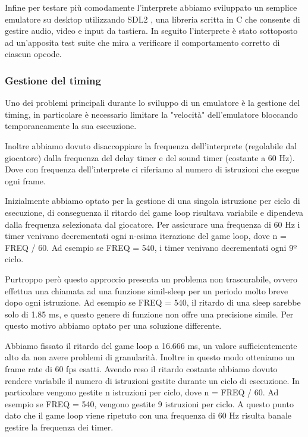 \documentclass[a4paper]{article}
\begin{document}
Infine per testare più comodamente l'interprete abbiamo sviluppato
un semplice emulatore su desktop utilizzando SDL2
\cite{libsdl:about}, una libreria scritta in C che consente di
gestire audio, video e input da tastiera.
In seguito l'interprete è stato sottoposto ad un'apposita
test suite \cite{github:chip8-test-suite} che mira a verificare
il comportamento corretto di ciascun opcode.

\subsubsection{Gestione del timing}

Uno dei problemi principali durante lo sviluppo di un emulatore è
la gestione del timing, in particolare è necessario limitare la
"velocità" dell'emulatore bloccando temporaneamente la sua
esecuzione.

Inoltre abbiamo dovuto disaccoppiare la frequenza dell'interprete
(regolabile dal giocatore) dalla frequenza del delay timer e del
sound timer (costante a 60 Hz). Dove con frequenza dell'interprete
ci riferiamo al numero di istruzioni che esegue ogni frame.


Inizialmente abbiamo optato per la gestione di una singola istruzione
per ciclo di esecuzione, di conseguenza il ritardo del game loop
risultava variabile e dipendeva dalla frequenza selezionata dal
giocatore. Per assicurare una frequenza di 60 Hz i timer
venivano decrementati ogni n-esima iterazione del game loop, dove
n = FREQ / 60. Ad esempio se FREQ = 540, i timer venivano
decrementati ogni 9º ciclo.

Purtroppo però questo approccio presenta un problema non
trascurabile, ovvero effettua una chiamata ad una funzione
simil-sleep per un periodo molto breve dopo ogni istruzione.
Ad esempio se FREQ = 540, il ritardo di una sleep sarebbe solo
di 1.85 ms, e questo genere di funzione non offre una precisione
simile. Per questo motivo abbiamo optato per una soluzione
differente.

Abbiamo fissato il ritardo del game loop a 16.666 ms, un valore
sufficientemente alto da non avere problemi di granularità. Inoltre
in questo modo otteniamo un frame rate di 60 fps esatti. Avendo
reso il ritardo costante abbiamo dovuto rendere variabile il numero
di istruzioni gestite durante un ciclo di esecuzione. In particolare
vengono gestite n istruzioni per ciclo, dove n = FREQ / 60.
Ad esempio se FREQ = 540, vengono gestite 9 istruzioni per ciclo.
A questo punto dato che il game loop viene ripetuto con una
frequenza di 60 Hz risulta banale gestire la frequenza dei timer.
\end{document}
